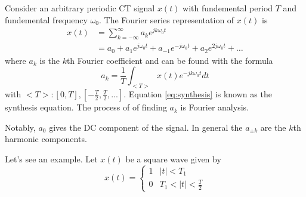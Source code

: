 Consider an arbitrary periodic CT signal $x(t)$ with fundemental
period $T$ and fundemental frequency $\omega_0$. The Fourier series
representation of $x(t)$ is
\begin{align}\label{eq:synthesis}
    x(t) & = \sum_{k=-\infty}^{\infty} a_k e^{jk\omega_0 t}                                  \\
         & = a_0 + a_1e^{j\omega_0 t} + a_{-1}e^{-j\omega_0 t} + a_2e^{2j\omega_0 t} + \dots
\end{align}
where $a_k$ is the $k$th Fourier coefficient and can be found with the formula
\begin{equation}
    a_k = \frac{1}{T} \int_{<T>} x(t) e^{-jk\omega_0 t} dt
\end{equation}
with $<T>: [0, T], [-\frac{T}{2}, \frac{T}{2}, ...]$.
Equation \ref{eq:synthesis} is known as the synthesis equation. The process of
of finding $a_k$ is Fourier analysis.

Notably, $a_0$ gives the DC component of the signal. In general the $a_{\pm k}$
are the $k$th harmonic components.

Let's see an example. Let $x(t)$ be a square wave given by
\begin{equation}
    x(t) = \begin{cases}
        1 & |t| < T_1               \\
        0 & T_1 < |t| < \frac{T}{2}
    \end{cases}
\end{equation}


